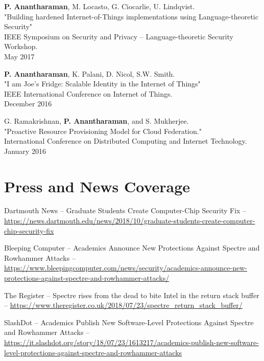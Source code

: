 \documentclass[letterpaper,10pt]{article}
\renewenvironment{itemize}{
	\begin{list}{}{
			\setlength{\leftmargin}{1.5em}
		}
	}{
	\end{list}
}
\begin{document}
\begin{etaremune}
	 \item {\bf P. Anantharaman}, M. Locasto, G. Ciocarlie, U. Lindqvist.\\
		 "Building hardened Internet-of-Things implementations using Language-theoretic Security"\\
				IEEE Symposium on Security and Privacy -- Language-theoretic Security Workshop.\\
				May 2017
			\item {\bf P. Anantharaman}, K. Palani, D. Nicol, S.W. Smith.\\
				"I am Joe's Fridge: Scalable Identity in the Internet of Things"\\
		IEEE International Conference on Internet of Things.\\
		December 2016
	\item G. Ramakrishnan, {\bf P. Anantharaman}, and S. Mukherjee.\\
		"Proactive Resource Provisioning Model for Cloud Federation."\\
		International Conference on Distributed Computing and Internet Technology.\\
		January 2016
	\end{etaremune}

	\section*{Press and News Coverage}

	\begin{itemize}
		\item Dartmouth News -- Graduate Students Create Computer-Chip Security Fix -- \url{https://news.dartmouth.edu/news/2018/10/graduate-students-create-computer-chip-security-fix}
		\item Bleeping Computer -- Academics Announce New Protections Against Spectre and Rowhammer Attacks -- \url{https://www.bleepingcomputer.com/news/security/academics-announce-new-protections-against-spectre-and-rowhammer-attacks/}
		\item The Register -- Spectre rises from the dead to bite Intel in the return stack buffer -- \url{https://www.theregister.co.uk/2018/07/23/spectre\_return\_stack\_buffer/}
		\item SlashDot -- Academics Publish New Software-Level Protections Against Spectre and Rowhammer Attacks -- \url{https://it.slashdot.org/story/18/07/23/1613217/academics-publish-new-software-level-protections-against-spectre-and-rowhammer-attacks}

	\end{itemize}
\end{document}
